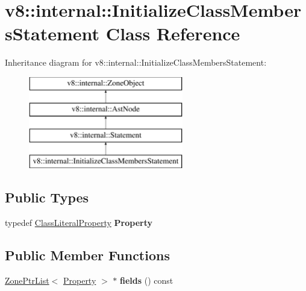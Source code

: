 \hypertarget{classv8_1_1internal_1_1InitializeClassMembersStatement}{}\section{v8\+:\+:internal\+:\+:Initialize\+Class\+Members\+Statement Class Reference}
\label{classv8_1_1internal_1_1InitializeClassMembersStatement}
Inheritance diagram for v8\+:\+:internal\+:\+:Initialize\+Class\+Members\+Statement\+:\begin{figure}[H]
\begin{center}
\leavevmode
\includegraphics[height=4.000000cm]{classv8_1_1internal_1_1InitializeClassMembersStatement}
\end{center}
\end{figure}
\subsection*{Public Types}
\begin{DoxyCompactItemize}
\item 
\mbox{\label{classv8_1_1internal_1_1InitializeClassMembersStatement_a3bad281ccac799afdd00c9800421cad5}} 
typedef \mbox{\hyperlink{classv8_1_1internal_1_1ClassLiteralProperty}{Class\+Literal\+Property}} {\bfseries Property}
\end{DoxyCompactItemize}
\subsection*{Public Member Functions}
\begin{DoxyCompactItemize}
\item 
\mbox{\label{classv8_1_1internal_1_1InitializeClassMembersStatement_ac90f00ac95673de250249ae323711b18}} 
\mbox{\hyperlink{classv8_1_1internal_1_1ZoneList}{Zone\+Ptr\+List}}$<$ \mbox{\hyperlink{classv8_1_1internal_1_1ClassLiteralProperty}{Property}} $>$ $\ast$ {\bfseries fields} () const
\end{DoxyCompactItemize}
